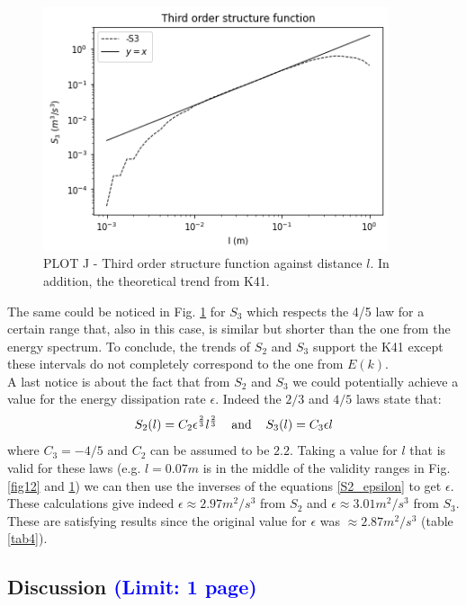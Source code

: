 \documentclass[11pt,titlepage]{article}
\begin{document}
\begin{center}
	\begin{figure} [h]
		\centering
		\includegraphics[width = 4in]{./figures/ex1_7_2.png}
		\caption{PLOT J - Third order structure function against distance $l$. In addition, the theoretical trend from K41.}
		\label{fig13}
	\end{figure}
\end{center}
The same could be noticed in Fig. \ref{fig13} for $S_3$ which respects the 4/5 law for a certain range that, also in this case, is similar but shorter than the one from the energy spectrum. To conclude, the trends of $S_2$ and $S_3$ support the K41 except these intervals do not completely correspond to the one from $E(k)$. \\
A last notice is about the fact that from $S_2$ and $S_3$ we could potentially achieve a value for the energy dissipation rate $\epsilon$. Indeed the $2/3$ and $4/5$ laws state that:
\begin{equation} \label{S2_epsilon}
	S_2(l) = C_2 \epsilon^\frac{2}{3} l^\frac{2}{3} \hspace{4mm} \text{and} \hspace{4mm}S_3(l) = C_3 \epsilon l
\end{equation}
where $C_3 = -4/5$ and $C_2$ can be assumed to be $2.2$. Taking a value for $l$ that is valid for these laws (e.g. $l=0.07m$ is in the middle of the validity ranges in Fig. \ref{fig12} and \ref{fig13}) we can then use the inverses of the equations \ref{S2_epsilon} to get $\epsilon$. These calculations give indeed $\epsilon \approx 2.97 m^2/s^3$ from $S_2$ and $\epsilon \approx 3.01 m^2/s^3$ from $S_3$. These are satisfying results since the original value for $\epsilon$ was $\approx 2.87 m^2/s^3$ (table \ref{tab4}).

\subsection{Discussion \textcolor{blue}{(Limit: 1 page)}} %
\end{document}
